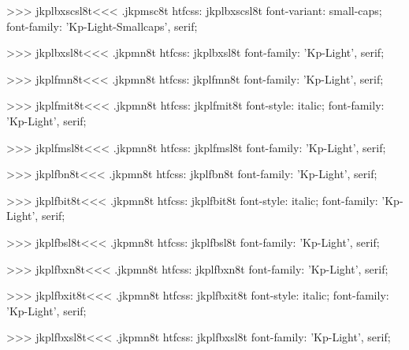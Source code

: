 >>>
\<jkplbxscsl8t\><<<
.jkpmsc8t
htfcss:  jkplbxscsl8t  font-variant: small-caps; font-family: 'Kp-Light-Smallcaps', serif;

>>>
\<jkplbxsl8t\><<<
.jkpmn8t
htfcss:  jkplbxsl8t  font-family: 'Kp-Light', serif;

>>>
\<jkplfmn8t\><<<
.jkpmn8t
htfcss:  jkplfmn8t  font-family: 'Kp-Light', serif;

>>>
\<jkplfmit8t\><<<
.jkpmn8t
htfcss:  jkplfmit8t  font-style: italic; font-family: 'Kp-Light', serif;

>>>
\<jkplfmsl8t\><<<
.jkpmn8t
htfcss:  jkplfmsl8t  font-family: 'Kp-Light', serif;

>>>
\<jkplfbn8t\><<<
.jkpmn8t
htfcss:  jkplfbn8t  font-family: 'Kp-Light', serif;

>>>
\<jkplfbit8t\><<<
.jkpmn8t
htfcss:  jkplfbit8t  font-style: italic; font-family: 'Kp-Light', serif;

>>>
\<jkplfbsl8t\><<<
.jkpmn8t
htfcss:  jkplfbsl8t  font-family: 'Kp-Light', serif;

>>>
\<jkplfbxn8t\><<<
.jkpmn8t
htfcss:  jkplfbxn8t  font-family: 'Kp-Light', serif;

>>>
\<jkplfbxit8t\><<<
.jkpmn8t
htfcss:  jkplfbxit8t  font-style: italic; font-family: 'Kp-Light', serif;

>>>
\<jkplfbxsl8t\><<<
.jkpmn8t
htfcss:  jkplfbxsl8t  font-family: 'Kp-Light', serif;

